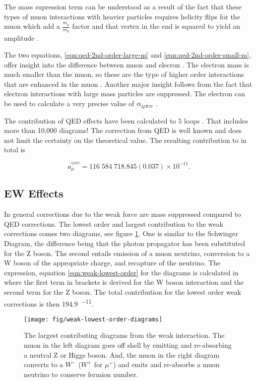 \noindent
The mass supression term can be understood as a result of the fact that these types of muon interactions with heavier particles requires helicity flips for the muon which add a $\frac{m_\mu}{m_p}$ factor and that vertex in the end is squared to yield an amplitude \cite{amm-of-muon}.

The two equations, \ref{eqn:qed-2nd-order-large-m} and \ref{eqn:qed-2nd-order-small-m}, offer insight into the difference between muon and elecron \gmtwo.  The electron mass is much smaller than the muon, so these are the type of higher order interactions that are enhanced in the muon \gmtwo.  Another major insight follows from the fact that electron interactions with large mass particles are suppressed.  The electron \gmtwo can be used to calculate a very precise value of $\alpha_{_{QED}}$ \cite{g-e-measurement}.

The contribution of QED effects have been calculated to 5 loops \cite{5-loop-qed}.  That includes more than 10,000 diagrams!  The correction from QED is well known and does not limit the certainty on the theoretical value.  The resulting contribution to \mugmtwo in total is

\begin{equation}
\label{eqn:qed-total}
a_\mu^{^{QED}} = 116\;584\;718.845(0.037) \times 10^{-11}.
\end{equation}

\subsection{EW Effects} \label{s-sec:theory-ew}

In general corrections due to the weak force are mass suppressed compared to QED corrections.  The lowest order and largest contribution to the weak corrections comes two diagrams, see figure \ref{fig:weak-lowest-order-diagrams}. One is similar to the Schwinger Diagram, the difference being that the photon propagator has been substituted for the Z boson.  The second entails emission of a muon neutrino, conversion to a W boson of the appropriate charge, and recapture of the neutrino.  The expression, equation \ref{eqn:weak-lowest-order} for the diagrams is calculated in \cite{the-muon-g-2} where the first term in brackets is derived for the W boson interaction and the second term for the Z boson.  The total contribution for the lowest order weak corrections is then \SI{194.9}{^{-11}}.

\begin{figure}
\centering
\texttt{[image: fig/weak-lowest-order-diagrams]}
\caption{The largest contributing diagrams from the weak interaction.  The muon in the left diagram goes off shell by emitting and re-absorbing a neutral Z or Higgs boson.  And, the muon in the right diagram converts to a $W^{-}$ ($W^{+}$ for $\mu^{+}$) and emits and re-absorbs a muon neutrino to conserve fermion number. \label{fig:weak-lowest-order-diagrams}}
\end{figure}

